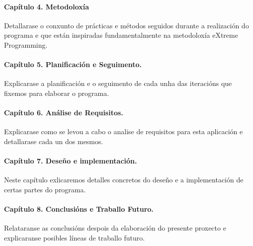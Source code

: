 \paragraph*{Capítulo 4. Metodoloxía}
Detallarase o conxunto de prácticas e métodos seguidos durante a realización do programa e que están inspiradas fundamentalmente na metodoloxía eXtreme Programming.

\paragraph*{Capítulo 5. Planificación e Seguimento.}
Explicarase a planificación e o seguimento de cada unha das iteracións que fixemos para elaborar o programa.

\paragraph*{Capítulo 6. Análise de Requisitos.}
Explicarase como se levou a cabo o analise de requisitos para esta aplicación e detallarase cada un dos mesmos.

\paragraph*{Capítulo 7. Deseño e implementación.}
Neste capítulo exlicaremos detalles concretos do deseño e a implementación de certas partes do programa.

\paragraph*{Capítulo 8. Conclusións e Traballo Futuro.}
Relataranse as conclusións despois da elaboración do presente proxecto e explicaranse posibles líneas de traballo futuro.





